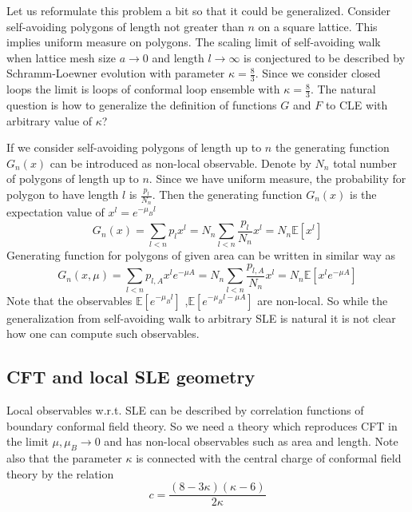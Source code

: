\documentclass[12pt]{article}
\begin{document}
Let us reformulate this problem a bit so that it could be generalized. Consider self-avoiding
polygons of length not greater than $n$ on a square lattice. This implies uniform measure on
polygons. The scaling limit of self-avoiding walk when lattice mesh size $a\to 0$ and length $l\to
\infty$ is conjectured to be described by Schramm-Loewner evolution with parameter
$\kappa=\frac{8}{3}$. Since we consider closed loops the limit is loops of conformal loop ensemble
with $\kappa=\frac{8}{3}$.
The natural question is how to generalize the definition of functions $G$ and $F$ to CLE with
arbitrary value of $\kappa$?

If we consider self-avoiding polygons of length up to $n$ the generating function $G_{n}(x)$ can be
introduced as non-local observable. Denote by $N_{n}$ total number of polygons of length up to $n$.
Since we have uniform measure, the probability for polygon to have length $l$ is
$\frac{p_{l}}{N_{n}}$. Then the generating function $G_{n}(x)$ is the expectation value of $x^{l}=e^{-\mu_{B}l}$
\begin{equation}
  \label{eq:102}
  G_{n}(x)=\sum_{l<n} p_{l} x^{l} = N_{n} \sum_{l<n} \frac{p_{l}}{N_{n}} x^{l} = N_{n}\mathbb{E}[x^{l}]
\end{equation}
Generating function for polygons of given area can be written in similar way as
\begin{equation}
  \label{eq:103}
   G_{n}(x,\mu)=\sum_{l<n} p_{l,A} x^{l} e^{-\mu A} = N_{n} \sum_{l<n} \frac{p_{l,A}}{N_{n}} x^{l} =
   N_{n}\mathbb{E}[x^{l} e^{-\mu A}]
\end{equation}
Note that the  observables $\mathbb{E}[e^{-\mu_{B}l}]$ ,$\mathbb{E}[e^{-\mu_{B}l -\mu A}]$ are
non-local. So while the generalization from self-avoiding walk to arbitrary SLE is natural it is not
clear how one can compute such observables.

\subsection{CFT and local SLE geometry}
\label{sec:cft-local-sle}

Local observables w.r.t. SLE can be described by correlation functions of boundary conformal field
theory. So we need a theory which reproduces CFT in the limit $\mu,\mu_{B}\to 0$ and has non-local
observables such as area and length. Note also that the parameter $\kappa$ is connected with the
central charge of conformal field theory by the relation
\begin{equation}
  \label{eq:113}
  c=\frac{(8-3\kappa)(\kappa-6)}{2\kappa}
\end{equation}
\end{document}
